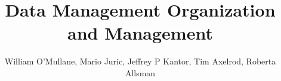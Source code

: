 \documentclass[DM,lsstdraft,SDP,toc]{lsstdoc}
\begin{document}
\title  {Data Management Organization and Management }
\setDocTitle[DM PMP] {}

\author   {William O'Mullane, Mario Juric, Jeffrey P Kantor,  Tim Axelrod,  Roberta Allsman}                %
\setDocDate     {\today}              %

%
%

%
%
\maketitle

%
%









\appendix



\end{document}
